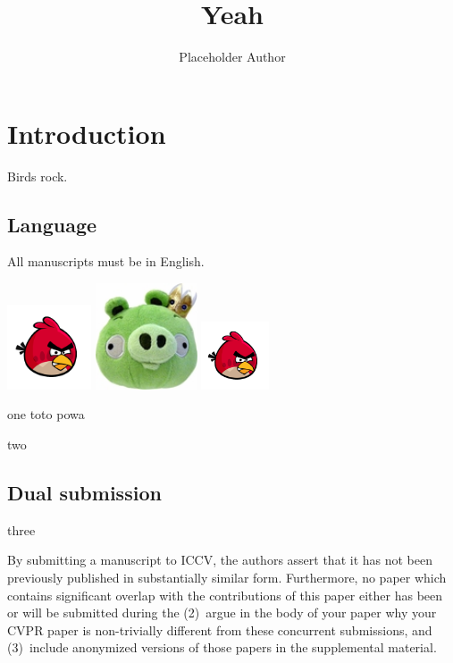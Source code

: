 \documentclass[10pt,twocolumn,letterpaper]{article}
\begin{document}
\title{Yeah}

\author{Placeholder Author}

\maketitle




\section{Introduction}

Birds rock.

\subsection{Language}

All manuscripts must be in English.

\includegraphics[width=2.5cm]{a_bird.png}
\includegraphics[width=3cm]{a_pig.png}
\includegraphics[width=2cm]{a_bird.png}

one
toto powa

two

\subsection{Dual submission}

three

By submitting a manuscript to ICCV, the authors assert that it has not been
previously published in substantially similar form. Furthermore, no paper
which contains significant overlap with the contributions of this paper
either has been or will be submitted during the
(2)~argue in the body of your paper why your CVPR paper is non-trivially
different from these concurrent submissions, and (3)~include anonymized
versions of those papers in the supplemental material.
\end{document}
